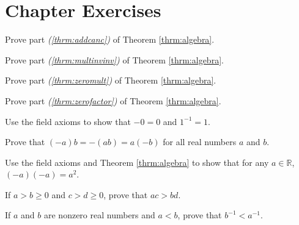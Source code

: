 \clearpage

\section*{Chapter  Exercises}
\anschapter

\begin{exercise}
Prove part {\itshape(\ref{thrm:addcanc})} of Theorem \ref{thrm:algebra}.
\end{exercise}

\begin{exercise}
Prove part {\itshape(\ref{thrm:multinvinv})} of Theorem \ref{thrm:algebra}.
\end{exercise}

\begin{exercise}\label{exer:zeromult}\markit
Prove part {\itshape(\ref{thrm:zeromult})} of Theorem \ref{thrm:algebra}.
\end{exercise}

\begin{exercise}
Prove part {\itshape(\ref{thrm:zerofactor})} of Theorem \ref{thrm:algebra}.
\end{exercise}

\begin{exercise}
Use the field axioms to show that $-0=0$ and $1^{-1}=1$.
\end{exercise}

\begin{exercise}
Prove that $(-a)b=-(ab)=a(-b)$ for all real numbers $a$ and $b$.
\end{exercise}

\begin{exercise}
Use the field axioms and Theorem \ref{thrm:algebra} to show that for any $a\in\mathbb R$, $(-a)(-a)=a^2$.
\end{exercise}

\begin{exercise} \label{ex:orderprod}\markit
If $a>b\geq0$ and $c>d\geq0$, prove that $ac>bd$.
\end{exercise}

\begin{exercise}
If $a$ and $b$ are nonzero real numbers and $a<b$, prove that $b^{-1}<a^{-1}$. 
\end{exercise}

